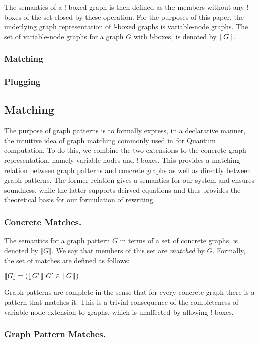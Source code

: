 \documentclass[runningheads]{llncs}
\newcommand{\vinterp}[1]{\lfloor\hspace{-0.27em}|\, #1\, |\hspace{-0.27em}\rfloor}
\newcommand{\binterp}[1]{\lceil\hspace{-0.27em}|\, #1\, |\hspace{-0.27em}\rceil}
\newcommand{\minterp}[1]{\llbracket #1 \rrbracket}
\begin{document}
\noindent The semantics of a !-boxed graph is then defined as the
members without any !-boxes of the set closed by these operation.  For
the purposes of this paper, the underlying graph representation of
!-boxed graphs is variable-node graphs. The set of variable-node
graphs for a graph $G$ with !-boxes, is denoted by $\binterp{G}$.

\subsubsection{Matching}


\subsubsection{Plugging}


\subsection{Matching}

The purpose of graph patterns is to formally express, in a declarative
manner, the intuitive idea of graph matching commonly used in for
Quantum computation. To do this, we combine the two extensions to the
concrete graph representation, namely variable nodes and !-boxes. This
provides a matching relation between graph patterns and concrete
graphs as well as directly between graph patterns. The former relation
gives a semantics for our system and ensures soundness, while the
latter supports deirved equations and thus provides the theoretical
basis for our formulation of rewriting.

\subsubsection{Concrete Matches.}

The semantics for a graph pattern $G$ in terms of a set of concrete
graphs, is denoted by $\minterp{G}$. We say that members of this set
are \emph{matched} by $G$. Formally, the set of matches are defined as
follows:

$\minterp{G} = (\vinterp{G'} | G' \in \binterp{G})$

Graph patterns are complete in the sense that for every concrete graph
there is a pattern that matches it. This is a trivial consequence of
the completeness of variable-node extension to graphs, which is
unaffected by allowing !-boxes.

\subsubsection{Graph Pattern Matches.}
\end{document}
